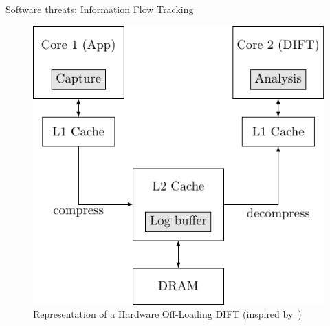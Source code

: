 \begin{frame}{Software threats: Information Flow Tracking}
\begin{minipage}[c]{0.4\textwidth}
{\begin{figure}
                \includegraphics[height=.5\textheight]{src/1_introduction/img/offloading.pdf}
                \caption{Representation of a Hardware Off-Loading DIFT (inspired by~\cite{KDK-09-dsn})}
                \label{fig:offloading}
            \end{figure}
        }
    \end{minipage}
\end{frame}

